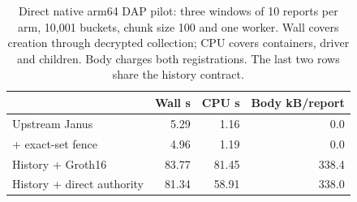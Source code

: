 \begin{table}[t]
\centering
\caption{Direct native arm64 DAP pilot: three windows of 10 reports per arm,
10,001 buckets, chunk size 100 and one worker. Wall covers creation through
decrypted collection; CPU covers containers, driver and children. Body charges
both registrations. The last two rows share the history contract.}
\label{tab:direct-baselines}
\footnotesize
\setlength{\tabcolsep}{3pt}
\begin{tabular}{@{}lrrr@{}}
\toprule
 & Wall s & CPU s & Body kB/report \\
\midrule
Upstream Janus & 5.29 & 1.16 & 0.0 \\
+ exact-set fence & 4.96 & 1.19 & 0.0 \\
History + Groth16 & 83.77 & 81.45 & 338.4 \\
History + direct authority & 81.34 & 58.91 & 338.0 \\
\bottomrule
\end{tabular}
\end{table}
